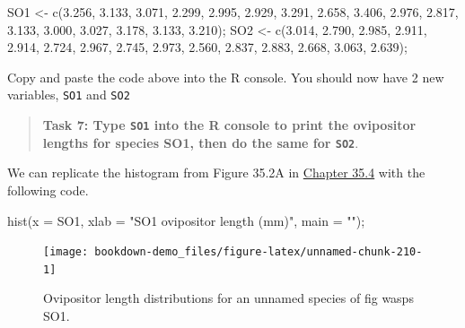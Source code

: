 \documentclass[
]{scrbook}
\newenvironment{Shaded}{\begin{snugshade}}{\end{snugshade}}
\newcommand{\AttributeTok}[1]{\textcolor[rgb]{0.77,0.63,0.00}{#1}}
\newcommand{\FloatTok}[1]{\textcolor[rgb]{0.00,0.00,0.81}{#1}}
\newcommand{\FunctionTok}[1]{\textcolor[rgb]{0.00,0.00,0.00}{#1}}
\newcommand{\NormalTok}[1]{#1}
\newcommand{\OtherTok}[1]{\textcolor[rgb]{0.56,0.35,0.01}{#1}}
\newcommand{\StringTok}[1]{\textcolor[rgb]{0.31,0.60,0.02}{#1}}
\begin{document}
\begin{Shaded}
\begin{Highlighting}[]
\NormalTok{SO1 }\OtherTok{\textless{}{-}} \FunctionTok{c}\NormalTok{(}\FloatTok{3.256}\NormalTok{, }\FloatTok{3.133}\NormalTok{, }\FloatTok{3.071}\NormalTok{, }\FloatTok{2.299}\NormalTok{, }\FloatTok{2.995}\NormalTok{, }\FloatTok{2.929}\NormalTok{, }\FloatTok{3.291}\NormalTok{, }\FloatTok{2.658}\NormalTok{, }\FloatTok{3.406}\NormalTok{, }
         \FloatTok{2.976}\NormalTok{, }\FloatTok{2.817}\NormalTok{, }\FloatTok{3.133}\NormalTok{, }\FloatTok{3.000}\NormalTok{, }\FloatTok{3.027}\NormalTok{, }\FloatTok{3.178}\NormalTok{, }\FloatTok{3.133}\NormalTok{, }\FloatTok{3.210}\NormalTok{);}
\NormalTok{SO2 }\OtherTok{\textless{}{-}} \FunctionTok{c}\NormalTok{(}\FloatTok{3.014}\NormalTok{, }\FloatTok{2.790}\NormalTok{, }\FloatTok{2.985}\NormalTok{, }\FloatTok{2.911}\NormalTok{, }\FloatTok{2.914}\NormalTok{, }\FloatTok{2.724}\NormalTok{, }\FloatTok{2.967}\NormalTok{, }\FloatTok{2.745}\NormalTok{, }\FloatTok{2.973}\NormalTok{, }
         \FloatTok{2.560}\NormalTok{, }\FloatTok{2.837}\NormalTok{, }\FloatTok{2.883}\NormalTok{, }\FloatTok{2.668}\NormalTok{, }\FloatTok{3.063}\NormalTok{, }\FloatTok{2.639}\NormalTok{);}
\end{Highlighting}
\end{Shaded}

Copy and paste the code above into the R console.
You should now have 2 new variables, \texttt{SO1} and \texttt{SO2}

\begin{quote}
\textbf{Task 7: Type \texttt{SO1} into the R console to print the ovipositor lengths for species SO1, then do the same for \texttt{SO2}}.
\end{quote}

We can replicate the histogram from Figure 35.2A in \protect\hyperlink{randomisation-for-hypothesis-testing}{Chapter 35.4} with the following code.

\begin{Shaded}
\begin{Highlighting}[]
\FunctionTok{hist}\NormalTok{(}\AttributeTok{x =}\NormalTok{ SO1, }\AttributeTok{xlab =} \StringTok{"SO1 ovipositor length (mm)"}\NormalTok{, }\AttributeTok{main =} \StringTok{""}\NormalTok{);}
\end{Highlighting}
\end{Shaded}

\begin{figure}
\texttt{[image: bookdown-demo\_files/figure-latex/unnamed-chunk-210-1]} \caption{Ovipositor length distributions for an unnamed species of fig wasps SO1.}\label{fig:unnamed-chunk-210}
\end{figure}
\end{document}
